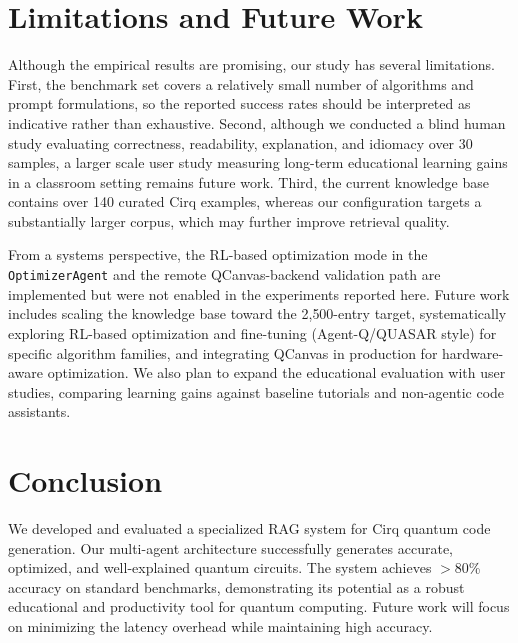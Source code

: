 \documentclass[runningheads]{llncs}
\begin{document}
\section{Limitations and Future Work}
Although the empirical results are promising, our study has several limitations. First, the benchmark set covers a relatively small number of algorithms and prompt formulations, so the reported success rates should be interpreted as indicative rather than exhaustive. Second, although we conducted a blind human study evaluating correctness, readability, explanation, and idiomacy over 30 samples, a larger scale user study measuring long-term educational learning gains in a classroom setting remains future work. Third, the current knowledge base contains over 140 curated Cirq examples, whereas our configuration targets a substantially larger corpus, which may further improve retrieval quality.

From a systems perspective, the RL-based optimization mode in the \texttt{Optimiz\-erAgent} and the remote QCanvas-backend validation path are implemented but were not enabled in the experiments reported here. Future work includes scaling the knowledge base toward the 2{,}500-entry target, systematically exploring RL-based optimization and fine-tuning (Agent-Q/QUASAR style) for specific algorithm families, and integrating QCanvas in production for hardware-aware optimization. We also plan to expand the educational evaluation with user studies, comparing learning gains against baseline tutorials and non-agentic code assistants.

\section{Conclusion}
We developed and evaluated a specialized RAG system for Cirq quantum code generation. Our multi-agent architecture successfully generates accurate, optimized, and well-explained quantum circuits. The system achieves $>$80\% accuracy on standard benchmarks, demonstrating its potential as a robust educational and productivity tool for quantum computing. Future work will focus on minimizing the latency overhead while maintaining high accuracy.




\clearpage

\clearpage

% 
\end{document}
